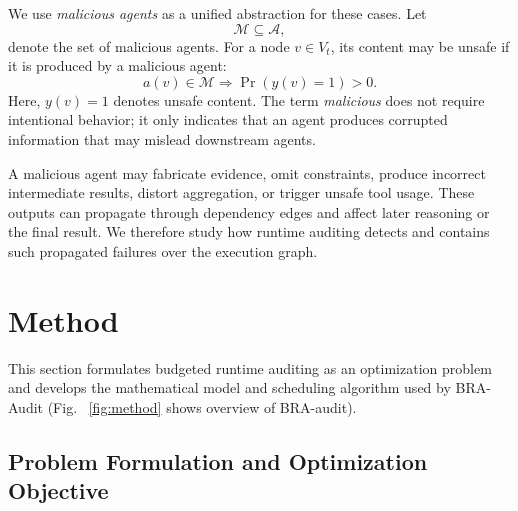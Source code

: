 \documentclass[letterpaper]{article} %
\begin{document}
We use \emph{malicious agents} as a unified abstraction for these cases. Let
\begin{equation}
\mathcal{M}\subseteq \mathcal{A},
\end{equation}
denote the set of malicious agents. For a node \(v\in V_t\), its content may be unsafe if it is produced by a malicious agent:
\begin{equation}
a(v)\in \mathcal{M}
\Longrightarrow
\Pr(y(v)=1)>0.
\end{equation}
Here, \(y(v)=1\) denotes unsafe content. The term \emph{malicious} does not require intentional behavior; it only indicates that an agent produces corrupted information that may mislead downstream agents.

A malicious agent may fabricate evidence, omit constraints, produce incorrect intermediate results, distort aggregation, or trigger unsafe tool usage. These outputs can propagate through dependency edges and affect later reasoning or the final result. We therefore study how runtime auditing detects and contains such propagated failures over the execution graph.


\section{Method}
This section formulates budgeted runtime auditing as an optimization problem and develops the mathematical model and scheduling algorithm used by BRA-Audit (Fig. ~\ref{fig:method} shows overview of BRA-audit).


\subsection{Problem Formulation and Optimization Objective}


\end{document}
